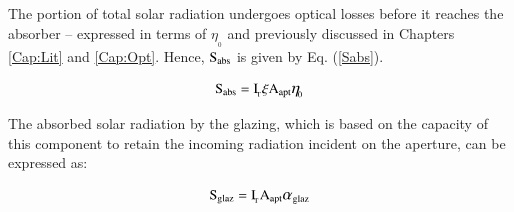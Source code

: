 
%
%
The portion of total solar radiation undergoes optical losses before it reaches the absorber -- expressed in terms of ${\eta_{\!_{0}}}$ and previously discussed in Chapters \ref{Cap:Lit} and \ref{Cap:Opt}. Hence, $\rm{S_{abs}}$ is given by Eq. (\ref{Sabs}).

\vspace{-0.75cm}
\begin{equation}
\mathrm{{S_{abs}} = I_{\!_{T}}\xi A_{apt}\mathlarger{{\eta_{\!_{0}}}}}
\label{Sabs}
\end{equation}

The absorbed solar radiation by the glazing, which is based on the capacity of this component to retain the incoming radiation incident on the aperture, can be expressed as:

\vspace{-0.75cm}
\begin{equation}
\mathrm{{S_{glaz}} = I_{\!_{T}}A_{apt}{\mathlarger{\alpha}_{\mathrm{glaz}}}}
\label{Sglaz}
\end{equation}

